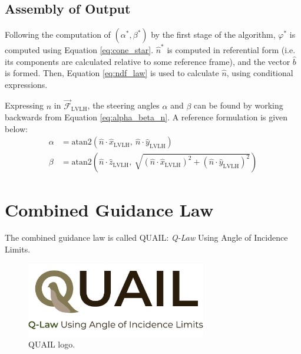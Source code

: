 \subsection{Assembly of Output}
Following the computation of \((\alpha^*, \beta^*)\) by the first stage of the algorithm, \(\varphi^*\) is computed using Equation \ref{eq:cone_star}. \(\hat{n}^*\) is computed in referential form (i.e. its components are calculated relative to some reference frame), and the vector \(\hat{b}\) is formed. Then, Equation \ref{eq:ndf_law} is used to calculate \(\hat{n}\), using conditional expressions.

Expressing \(\hat{n}\) in \(\vec{\mathcal{F}}_{\text{LVLH}}\), the steering angles \(\alpha\) and \(\beta\) can be found by working backwards from Equation \ref{eq:alpha_beta_n}. A reference formulation is given below:
\begin{align*}
  \alpha & = \mathrm{atan2}\left(\hat{n} \cdot \hat{x}_{\text{LVLH}}, \ \hat{n} \cdot \hat{y}_{\text{LVLH}}\right)                                                      \\
  \beta  & = \mathrm{atan2}\left(\hat{n} \cdot \hat{z}_{\text{LVLH}}, \ \sqrt{(\hat{n} \cdot \hat{x}_{\text{LVLH}})^2 + (\hat{n} \cdot \hat{y}_{\text{LVLH}})^2}\right)
\end{align*}

\section{Combined Guidance Law}
The combined guidance law is called QUAIL: \textit{Q-Law} Using Angle of Incidence Limits.

\begin{figure}[H]
  \centering
  \includegraphics[width=0.7\textwidth]{figures/quail_logo_v2.pdf}
  \caption{QUAIL logo.}
  \label{fig:quail_logo}
\end{figure}


